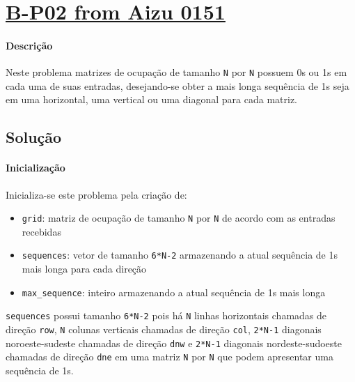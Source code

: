 \documentclass[a4paper]{article}
\begin{document}
\newpage
\section{\href{https://vjudge.net/problem/Aizu-0151}{B-P02 from Aizu 0151}}

\paragraph{Descrição} Neste problema matrizes de ocupação de tamanho \texttt{N} por \texttt{N} possuem 0s ou 1s em cada uma de suas entradas, desejando-se obter a mais longa sequência de 1s seja em uma horizontal, uma vertical ou uma diagonal para cada matriz.

\subsection{Solução}

\paragraph{Inicialização} Inicializa-se este problema pela criação de:
\begin{itemize}
    \item \texttt{grid}: matriz de ocupação de tamanho \texttt{N} por \texttt{N} de acordo com as entradas recebidas
    \item \texttt{sequences}: vetor de tamanho \texttt{6*N-2} armazenando a atual sequência de 1s mais longa para cada direção
    \item \texttt{max\_sequence}: inteiro armazenando a atual sequência de 1s mais longa
\end{itemize}
\texttt{sequences} possui tamanho \texttt{6*N-2} pois há \texttt{N} linhas horizontais chamadas de direção \texttt{row}, \texttt{N} colunas verticais chamadas de direção \texttt{col}, \texttt{2*N-1} diagonais noroeste-sudeste chamadas de direção \texttt{dnw} e \texttt{2*N-1} diagonais nordeste-sudoeste chamadas de direção \texttt{dne} em uma matriz \texttt{N} por \texttt{N} que podem apresentar uma sequência de 1s.
\end{document}

